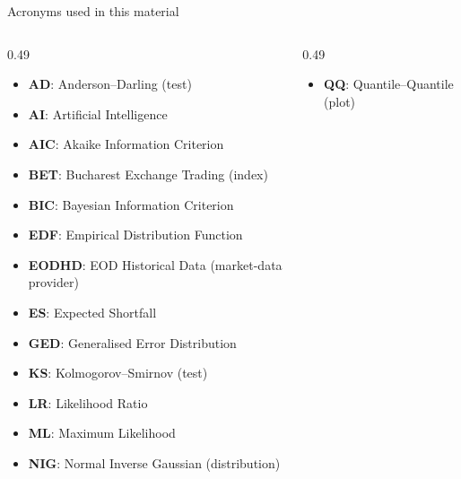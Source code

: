 {
\begin{frame}[noframenumbering]
    \titlepage
\end{frame}
}
\begin{frame}{Acronyms used in this material}
\begin{columns}[T]
\begin{column}{0.49\textwidth}
\begin{itemize}\setlength{\itemsep}{0pt}
    \item \textbf{AD}: Anderson–Darling (test)
    \item \textbf{AI}: Artificial Intelligence
    \item \textbf{AIC}: Akaike Information Criterion
    \item \textbf{BET}: Bucharest Exchange Trading (index)
    \item \textbf{BIC}: Bayesian Information Criterion
    \item \textbf{EDF}: Empirical Distribution Function
    \item \textbf{EODHD}: EOD Historical Data (market-data provider)
    \item \textbf{ES}: Expected Shortfall
    \item \textbf{GED}: Generalised Error Distribution
    \item \textbf{KS}: Kolmogorov–Smirnov (test)
    \item \textbf{LR}: Likelihood Ratio
    \item \textbf{ML}: Maximum Likelihood
    \item \textbf{NIG}: Normal Inverse Gaussian (distribution)
\end{itemize}
\end{column}
\begin{column}{0.49\textwidth}
\begin{itemize}\setlength{\itemsep}{0pt}
    \item \textbf{QQ}: Quantile–Quantile (plot)
\end{itemize}
\end{column}
\end{columns}
\end{frame}


